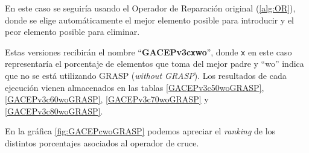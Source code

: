 En este caso se seguiría usando el Operador de Reparación original (\ref{alg:OR}), donde se elige automáticamente el mejor elemento posible para introducir y el peor elemento posible para eliminar.

Estas versiones recibirán el nombre ``\textbf{GACEPv3c\texttt{x}wo}'', donde \texttt{x} en este caso representaría el porcentaje de elementos que toma del mejor padre y ``wo'' indica que no se está utilizando GRASP (\textit{without GRASP}). 
Los resultados de cada ejecución vienen almacenados en las tablas \ref{GACEPv3c50woGRASP}, \ref{GACEPv3c60woGRASP}, \ref{GACEPv3c70woGRASP} y \ref{GACEPv3c80woGRASP}.

En la gráfica \ref{fig:GACEPcwoGRASP} podemos apreciar el \textit{ranking} de los distintos porcentajes asociados al operador de cruce.

